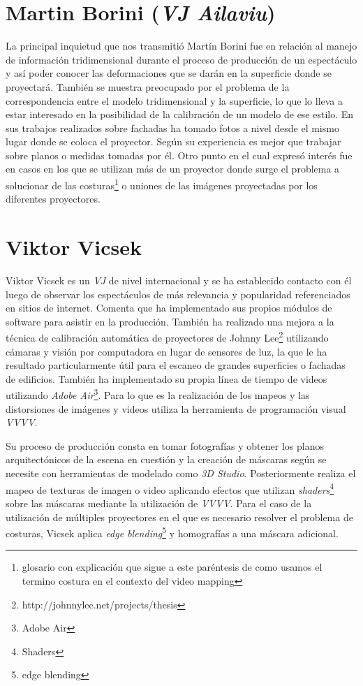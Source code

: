 \section{Martin Borini (\emph{VJ Ailaviu})}
La principal inquietud que nos transmitió Martín Borini\cite{Ailaviu} fue en relación al manejo de información tridimensional durante el proceso de producción de un espectáculo y así poder conocer las deformaciones que se darán en la superficie donde se proyectará. También se muestra preocupado por el problema de la correspondencia entre el modelo tridimensional y la superficie, lo que lo lleva a estar interesado en la posibilidad de la calibración de un modelo de ese estilo.
En sus trabajos realizados sobre fachadas ha tomado fotos a nivel desde el mismo lugar donde se coloca el proyector. Según su experiencia es mejor que trabajar sobre planos o medidas tomadas por él. Otro punto en el cual expresó interés fue en casos en los que se utilizan más de un proyector donde surge el problema a solucionar de las costuras\footnote{glosario con explicación que sigue a este paréntesis de como usamos el termino costura en el contexto del video mapping} o uniones de las imágenes proyectadas por los diferentes proyectores.

\section{Viktor Vicsek}
Viktor Vicsek\cite{Viktorvicsek} es un \emph{VJ} de nivel internacional y se ha establecido contacto con él luego de observar los espectáculos de más relevancia y popularidad referenciados en sitios de internet. Comenta que ha implementado sus propios módulos de software para asistir en la producción. También ha realizado una mejora a la técnica de calibración automática de proyectores de Johnny Lee\footnote{http://johnnylee.net/projects/thesis} utilizando cámaras y visión por computadora en lugar de sensores de luz, la que le ha resultado particularmente útil para el escaneo de grandes superficies o fachadas de edificios. También ha implementado su propia línea de tiempo de videos utilizando \emph{Adobe Air}\footnote{Adobe Air}. Para lo que es la realización de los mapeos y las distorsiones de imágenes y videos utiliza la herramienta de programación visual \emph{VVVV}.

Su proceso de producción consta en tomar fotografías y obtener los planos arquitectónicos de la escena en cuestión y la creación de máscaras según se necesite con herramientas de modelado como \emph{3D Studio}. Posteriormente realiza el mapeo de texturas de imagen o video aplicando efectos que utilizan \emph{shaders}\footnote{Shaders} sobre las máscaras mediante la utilización de \emph{VVVV}. Para el caso de la utilización de múltiples proyectores en el que es necesario resolver el problema de costuras, Vicsek aplica \emph{edge blending}\footnote{edge blending} y homografías a una máscara adicional.


